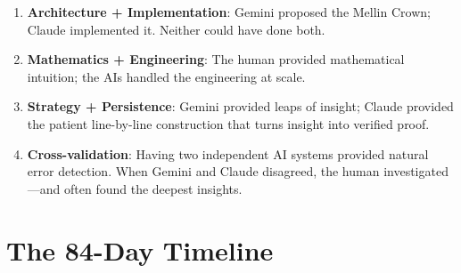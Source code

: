 \documentclass[11pt,a4paper]{article}
\begin{document}
\begin{enumerate}
  \item \textbf{Architecture + Implementation}: Gemini proposed the
    Mellin Crown; Claude implemented it. Neither could have done both.
  \item \textbf{Mathematics + Engineering}: The human provided
    mathematical intuition; the AIs handled the engineering at scale.
  \item \textbf{Strategy + Persistence}: Gemini provided leaps of
    insight; Claude provided the patient line-by-line construction
    that turns insight into verified proof.
  \item \textbf{Cross-validation}: Having two independent AI systems
    provided natural error detection. When Gemini and Claude disagreed,
    the human investigated---and often found the deepest insights.
\end{enumerate}

\section{The 84-Day Timeline}
\end{document}
